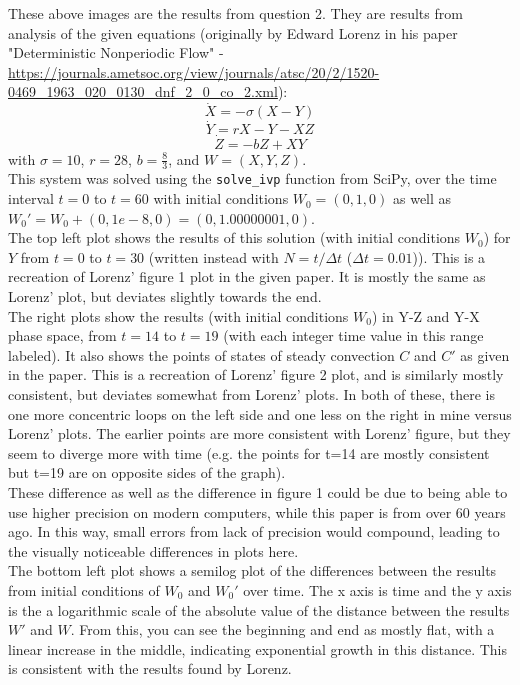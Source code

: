\documentclass{article}
\begin{document}
These above images are the results from question 2. They are results from analysis of the given equations (originally by Edward Lorenz in his paper "Deterministic Nonperiodic Flow" - \url{https://journals.ametsoc.org/view/journals/atsc/20/2/1520-0469_1963_020_0130_dnf_2_0_co_2.xml}):
\[\dot{X} = -\sigma (X - Y)\]
\[\dot{Y} = rX - Y - XZ\]
\[\dot{Z} = -bZ + XY\]
with $\sigma=10$, $r=28$, $b = \frac{8}{3}$, and $W = (X, Y, Z)$.
\\This system was solved using the \texttt{solve\_ivp} function from SciPy, over the time interval $t=0$ to $t=60$ with initial conditions $W_0 = (0, 1, 0)$ as well as $W_0' = W_0+(0, 1e-8, 0) = (0, 1.00000001, 0)$.
\\The top left plot shows the results of this solution (with initial conditions $W_0$) for $Y$ from $t=0$ to $t=30$ (written instead with $N = t/\Delta t$ ($\Delta t = 0.01$)). This is a recreation of Lorenz' figure 1 plot in the given paper. It is mostly the same as Lorenz' plot, but deviates slightly towards the end.
\\The right plots show the results (with initial conditions $W_0$) in Y-Z and Y-X phase space, from $t=14$ to $t=19$ (with each integer time value in this range labeled). It also shows the points of states of steady convection $C$ and $C'$ as given in the paper. This is a recreation of Lorenz' figure 2 plot, and is similarly mostly consistent, but deviates somewhat from Lorenz' plots. In both of these, there is one more concentric loops on the left side and one less on the right in mine versus Lorenz' plots. The earlier points are more consistent with Lorenz' figure, but they seem to diverge more with time (e.g. the points for t=14 are mostly consistent but t=19 are on opposite sides of the graph).
\\These difference as well as the difference in figure 1 could be due to being able to use higher precision on modern computers, while this paper is from over 60 years ago. In this way, small errors from lack of precision would compound, leading to the visually noticeable differences in plots here. 
\\The bottom left plot shows a semilog plot of the differences between the results from initial conditions of $W_0$ and $W_0'$ over time. The x axis is time and the y axis is the a logarithmic scale of the absolute value of the distance between the results $W'$ and $W$. From this, you can see the beginning and end as mostly flat, with a linear increase in the middle, indicating exponential growth in this distance. This is consistent with the results found by Lorenz.
\end{document}
